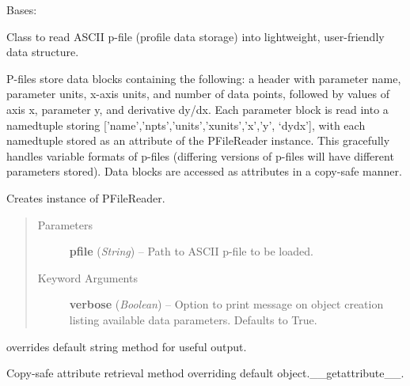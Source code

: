 \documentclass[letterpaper,10pt,english]{sphinxmanual}
\begin{document}
\begin{fulllineitems}
\label{eqtools:eqtools.pfilereader.PFileReader}
Bases: 

Class to read ASCII p-file (profile data storage) into lightweight,
user-friendly data structure.

P-files store data blocks containing the following: a header with parameter
name, parameter units, x-axis units, and number of data points, followed by
values of axis x, parameter y, and derivative dy/dx.  Each parameter block
is read into a namedtuple storing {[}'name','npts','units','xunits','x','y',
`dydx'{]}, with each namedtuple stored as an attribute of the PFileReader
instance.  This gracefully handles variable formats of p-files (differing
versions of p-files will have different parameters stored).  Data blocks
are accessed as attributes in a copy-safe manner.

Creates instance of PFileReader.
\begin{quote}\begin{description}
\item[{Parameters}] \leavevmode
\textbf{pfile} (\emph{String}) --
Path to ASCII p-file to be loaded.

\item[{Keyword Arguments}] \leavevmode
\textbf{verbose} (\emph{Boolean}) --
Option to print message on object creation
listing available data parameters. Defaults to True.

\end{description}\end{quote}

\begin{fulllineitems}
\label{eqtools:eqtools.pfilereader.PFileReader.__str__}
overrides default string method for useful output.

\end{fulllineitems}


\begin{fulllineitems}
\label{eqtools:eqtools.pfilereader.PFileReader.__getattribute__}
Copy-safe attribute retrieval method overriding default
object.\_\_getattribute\_\_.


\end{fulllineitems}
\end{fulllineitems}
\end{document}
